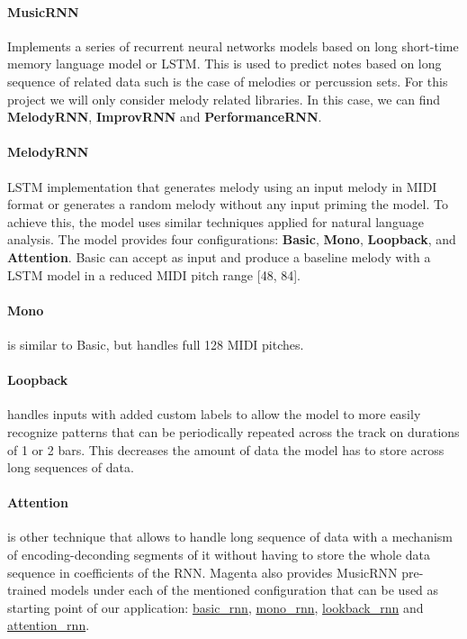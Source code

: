 \paragraph{MusicRNN} Implements a series of recurrent neural networks models based on long
short-time memory language model or LSTM. This is used to predict notes based on long
sequence of related data such is the case of melodies or percussion sets. For this project
we will only consider melody related libraries. In this case, we can find \textbf{MelodyRNN},
\textbf{ImprovRNN} and \textbf{PerformanceRNN}.

\paragraph{MelodyRNN} LSTM implementation that generates melody using an input melody in
MIDI format or generates a random melody without any input priming the model. To achieve
this, the model uses similar techniques applied for natural language analysis. The model
provides four configurations: \textbf{Basic}, \textbf{Mono}, \textbf{Loopback}, and
\textbf{Attention}. Basic can accept as input and produce a baseline melody with a LSTM
model in a reduced MIDI pitch range [48, 84].

\paragraph{Mono} is similar to Basic, but handles full 128 MIDI pitches.

\paragraph{Loopback} handles inputs with added custom labels to allow the model to more easily
recognize patterns that can be periodically repeated across the track on durations of 1 or
2 bars. This decreases the amount of data the model has to store across long sequences of
data.

\paragraph{Attention} is other technique that allows to handle long sequence of data with
a mechanism of encoding-deconding segments of it without having to store the whole data
sequence in coefficients of the RNN. Magenta also provides MusicRNN pre-trained models
under each of the mentioned configuration that can be used as starting point of our
application: \url{basic_rnn}, \url{mono_rnn}, \url{lookback_rnn} and \url{attention_rnn}.


